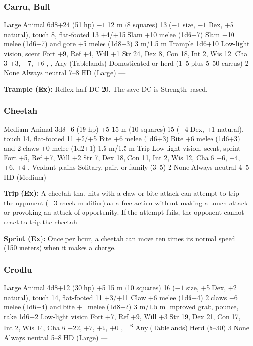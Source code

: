 \subsubsection{Carru, Bull}
\begin{MonsterStats}
{Large Animal}
{6d8+24 (51 hp)}
{$-1$}
{12 m (8 squares)}
{13 ($-1$ size, $-1$ Dex, +5 natural), touch 8, flat-footed 13}
{+4/+15}
{Slam +10 melee (1d6+7)}
{Slam +10 melee (1d6+7) and gore +5 melee (1d8+3)}
{3 m/1.5 m}
{Trample 1d6+10}
{Low-light vision, scent}
{Fort +9, Ref +4, Will +1}
{Str 24, Dex 8, Con 18, Int 2, Wis 12, Cha 3}
{ +3,  +7,  +6}
{, , }
{Any (Tablelands)}
{Domesticated or herd (1--5 plus 5--50 carrus)}
{2}
{None}
{Always neutral}
{7--8 HD (Large)}
{---}
\end{MonsterStats}

\textbf{Trample (Ex):} Reflex half DC 20. The save DC is Strength-based.

\subsubsection{Cheetah}
\begin{MonsterStats}
{Medium Animal}
{3d8+6 (19 hp)}
{+5}
{15 m (10 squares)}
{15 (+4 Dex, +1 natural), touch 14, flat-footed 11}
{+2/+5}
{Bite +6 melee (1d6+3)}
{Bite +6 melee (1d6+3) and 2 claws +0 melee (1d2+1)}
{1.5 m/1.5 m}
{Trip}
{Low-light vision, scent, sprint}
{Fort +5, Ref +7, Will +2}
{Str 7, Dex 18, Con 11, Int 2, Wis 12, Cha 6}
{ +6,  +4,  +6,  +4}
{, }
{Verdant plains}
{Solitary, pair, or family (3--5)}
{2}
{None}
{Always neutral}
{4--5 HD (Medium)}
{---}
\end{MonsterStats}

\textbf{Trip (Ex):} A cheetah that hits with a claw or bite attack can attempt to trip the opponent (+3 check modifier) as a free action without making a touch attack or provoking an attack of opportunity. If the attempt fails, the opponent cannot react to trip the cheetah.

\textbf{Sprint (Ex):} Once per hour, a cheetah can move ten times its normal speed (150 meters) when it makes a charge.

\subsubsection{Crodlu}
\begin{MonsterStats}
{Large Animal}
{4d8+12 (30 hp)}
{+5}
{15 m (10 squares)}
{16 ($-1$ size, +5 Dex, +2 natural), touch 14, flat-footed 11}
{+3/+11}
{Claw +6 melee (1d6+4)}
{2 claws +6 melee (1d6+4) and bite +1 melee (1d8+2)}
{3 m/1.5 m}
{Improved grab, pounce, rake 1d6+2}
{Low-light vision}
{Fort +7, Ref +9, Will +3}
{Str 19, Dex 21, Con 17, Int 2, Wis 14, Cha 6}
{ +22,  +7,  +9,  +0}
{, , \textsuperscript{B}}
{Any (Tablelands)}
{Herd (5--30)}
{3}
{None}
{Always neutral}
{5--8 HD (Large)}
{---}
\end{MonsterStats}

